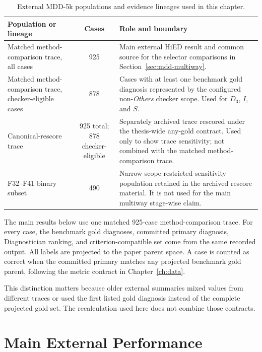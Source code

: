 \begin{table}[htbp]
\centering
\caption{External MDD-5k populations and evidence lineages used in this chapter.}
\label{tab:external-inventory}
\small
\begin{tabularx}{\textwidth}{|>{\raggedright\arraybackslash}p{3.5cm}|c|>{\raggedright\arraybackslash}X|}
\hline
\textbf{Population or lineage} & \textbf{Cases} & \textbf{Role and boundary}\\
\hline
Matched method-comparison trace, all cases & 925 & Main external HiED result and common source for the selector comparisons in Section~\ref{sec:mdd-multiway}.\\
\hline
Matched method-comparison trace, checker-eligible cases & 878 & Cases with at least one benchmark gold diagnosis represented by the configured non-\emph{Others} checker scope. Used for \(D_3\), \(I\), and \(S\).\\
\hline
Canonical-rescore trace & 925 total; 878 checker-eligible & Separately archived trace rescored under the thesis-wide any-gold contract. Used only to show trace sensitivity; not combined with the matched method-comparison trace.\\
\hline
F32--F41 binary subset & 490 & Narrow scope-restricted sensitivity population retained in the archived rescore material. It is not used for the main multiway stage-wise claim.\\
\hline
\end{tabularx}
\end{table}

The main results below use one matched 925-case method-comparison trace. For every case, the benchmark gold diagnoses, committed primary diagnosis, Diagnostician ranking, and criterion-compatible set come from the same recorded output. All labels are projected to the paper parent space. A case is counted as correct when the committed primary matches any projected benchmark gold parent, following the metric contract in Chapter~\ref{ch:data}.

This distinction matters because older external summaries mixed values from different traces or used the first listed gold diagnosis instead of the complete projected gold set. The recalculation used here does not combine those contracts.

\section{Main External Performance}
\label{sec:external-main-performance}

